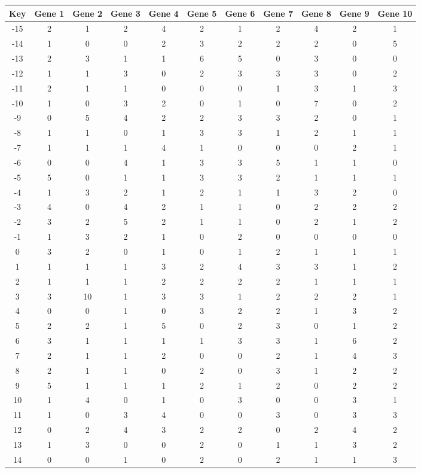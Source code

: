 \begin{tabular}{|c|c|c|c|c|c|c|c|c|c|c|}
\hline
Key & Gene 1 & Gene 2 & Gene 3 & Gene 4 & Gene 5 & Gene 6 & Gene 7 & Gene 8 & Gene 9 & Gene 10 \\
\hline
-15 & 2 & 1 & 2 & 4 & 2 & 1 & 2 & 4 & 2 & 1 \\
-14 & 1 & 0 & 0 & 2 & 3 & 2 & 2 & 2 & 0 & 5 \\
-13 & 2 & 3 & 1 & 1 & 6 & 5 & 0 & 3 & 0 & 0 \\
-12 & 1 & 1 & 3 & 0 & 2 & 3 & 3 & 3 & 0 & 2 \\
-11 & 2 & 1 & 1 & 0 & 0 & 0 & 1 & 3 & 1 & 3 \\
-10 & 1 & 0 & 3 & 2 & 0 & 1 & 0 & 7 & 0 & 2 \\
-9 & 0 & 5 & 4 & 2 & 2 & 3 & 3 & 2 & 0 & 1 \\
-8 & 1 & 1 & 0 & 1 & 3 & 3 & 1 & 2 & 1 & 1 \\
-7 & 1 & 1 & 1 & 4 & 1 & 0 & 0 & 0 & 2 & 1 \\
-6 & 0 & 0 & 4 & 1 & 3 & 3 & 5 & 1 & 1 & 0 \\
-5 & 5 & 0 & 1 & 1 & 3 & 3 & 2 & 1 & 1 & 1 \\
-4 & 1 & 3 & 2 & 1 & 2 & 1 & 1 & 3 & 2 & 0 \\
-3 & 4 & 0 & 4 & 2 & 1 & 1 & 0 & 2 & 2 & 2 \\
-2 & 3 & 2 & 5 & 2 & 1 & 1 & 0 & 2 & 1 & 2 \\
-1 & 1 & 3 & 2 & 1 & 0 & 2 & 0 & 0 & 0 & 0 \\
0 & 3 & 2 & 0 & 1 & 0 & 1 & 2 & 1 & 1 & 1 \\
1 & 1 & 1 & 1 & 3 & 2 & 4 & 3 & 3 & 1 & 2 \\
2 & 1 & 1 & 1 & 2 & 2 & 2 & 2 & 1 & 1 & 1 \\
3 & 3 & 10 & 1 & 3 & 3 & 1 & 2 & 2 & 2 & 1 \\
4 & 0 & 0 & 1 & 0 & 3 & 2 & 2 & 1 & 3 & 2 \\
5 & 2 & 2 & 1 & 5 & 0 & 2 & 3 & 0 & 1 & 2 \\
6 & 3 & 1 & 1 & 1 & 1 & 3 & 3 & 1 & 6 & 2 \\
7 & 2 & 1 & 1 & 2 & 0 & 0 & 2 & 1 & 4 & 3 \\
8 & 2 & 1 & 1 & 0 & 2 & 0 & 3 & 1 & 2 & 2 \\
9 & 5 & 1 & 1 & 1 & 2 & 1 & 2 & 0 & 2 & 2 \\
10 & 1 & 4 & 0 & 1 & 0 & 3 & 0 & 0 & 3 & 1 \\
11 & 1 & 0 & 3 & 4 & 0 & 0 & 3 & 0 & 3 & 3 \\
12 & 0 & 2 & 4 & 3 & 2 & 2 & 0 & 2 & 4 & 2 \\
13 & 1 & 3 & 0 & 0 & 2 & 0 & 1 & 1 & 3 & 2 \\
14 & 0 & 0 & 1 & 0 & 2 & 0 & 2 & 1 & 1 & 3 \\
\hline
\end{tabular}